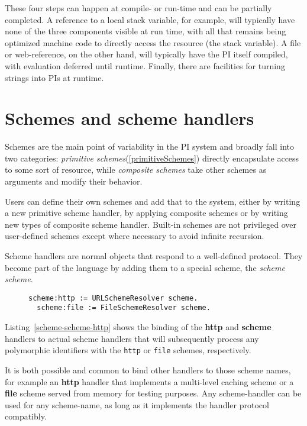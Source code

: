 \documentclass[preprint,authoryear]{acm_proc_article-sp}
\begin{document}
These four steps can happen at compile- or run-time and can be partially completed.
A reference to a local stack variable, for example, will typically have none of the
three components visible at run time, with all that remains being optimized 
machine code to directly access the resource (the stack variable).
A file or web-reference, on the other hand, will typically have the PI itself
compiled, with evaluation deferred until runtime.  Finally, there are facilities
for turning strings into PIs at runtime.


\section{Schemes and scheme handlers}

Schemes are the main point of variability in the PI system
and broadly fall into two categories:   {\em primitive schemes}(\ref{primitiveSchemes})
directly encapsulate access to some sort of resource, while {\em composite schemes} 
take other schemes as arguments and modify their behavior.


Users can define their own schemes and add that 
to the system, either by writing
a new primitive scheme handler, by applying composite schemes or by writing new types
of composite scheme handler.  Built-in schemes are not privileged over user-defined
schemes except where necessary to avoid infinite recursion.

Scheme handlers are normal objects that respond to a well-defined protocol.  They
become part of the language by adding them to a special scheme, the {\em scheme scheme}.

\begin{figure}[htbp]
\begin{lstlisting}[style=L,label=scheme-scheme-http,caption=Adding the http and file schemes.]
  scheme:http := URLSchemeResolver scheme.
  scheme:file := FileSchemeResolver scheme.
\end{lstlisting}
\end{figure}

Listing~\ref{scheme-scheme-http} shows the binding of the {\bf http} and {\bf scheme}
handlers to actual scheme handlers that will subsequently process any polymorphic
identifiers with the {\tt http} or {\tt file} schemes, respectively. 

It is both possible and common to bind other handlers to those scheme
names, for example an {\bf http} handler that implements a multi-level caching scheme
or a {\bf file} scheme served from memory for testing purposes.  Any scheme-handler
can be used for any scheme-name, as long as it implements the handler protocol
compatibly.
\end{document}
